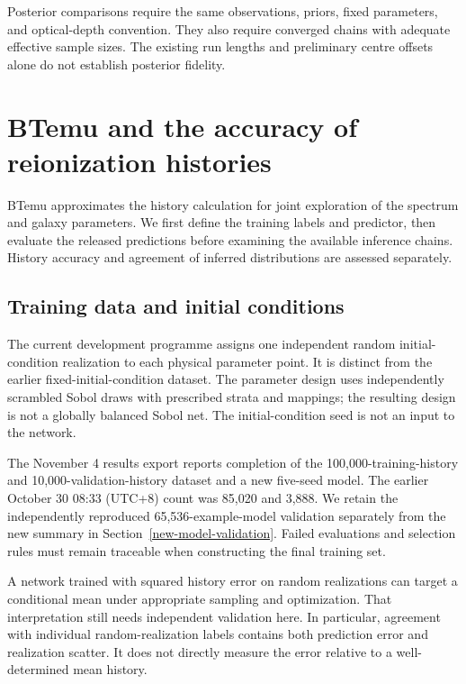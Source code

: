 Posterior comparisons require the same observations, priors, fixed parameters, and optical-depth convention. They also require converged chains with adequate effective sample sizes. The existing run lengths and preliminary centre offsets alone do not establish posterior fidelity.

\section{BTemu and the accuracy of reionization histories}\label{btemu-a-surrogate-for-neutral-fraction-histories}

BTemu approximates the history calculation for joint exploration of the spectrum and galaxy parameters. We first define the training labels and predictor, then evaluate the released predictions before examining the available inference chains. History accuracy and agreement of inferred distributions are assessed separately.

\subsection{Training data and initial conditions}\label{training-data-and-initial-conditions}

The current development programme assigns one independent random initial-condition realization to each physical parameter point. It is distinct from the earlier fixed-initial-condition dataset. The parameter design uses independently scrambled Sobol draws with prescribed strata and mappings; the resulting design is not a globally balanced Sobol net. The initial-condition seed is not an input to the network.

The November 4 results export reports completion of the 100,000-training-history and 10,000-validation-history dataset and a new five-seed model. The earlier October 30 08:33 (UTC+8) count was 85,020 and 3,888. We retain the independently reproduced 65,536-example-model validation separately from the new summary in Section~\ref{new-model-validation}. Failed evaluations and selection rules must remain traceable when constructing the final training set.

A network trained with squared history error on random realizations can target a conditional mean under appropriate sampling and optimization. That interpretation still needs independent validation here. In particular, agreement with individual random-realization labels contains both prediction error and realization scatter. It does not directly measure the error relative to a well-determined mean history.

